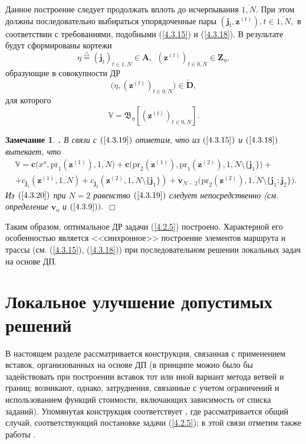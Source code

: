 \documentclass[11pt,twoside,openany]{report}
\newcommand{\bfn}{\begin{equation}}
\newcommand{\efn}{\end{equation}}
\newcommand{\df}{\stackrel{\triangle}{=}}
\newcommand{\ov}{\overline}
\newcounter{theo}
\newcounter{zam}
\newtheorem{zam}{Замечание}[section]
\newcommand{\TL}{\mbox{\bf{$\!\!$.}}}
\newcommand{\sm}{\setminus}
\begin{document}
{$$$$
Данное построение следует продолжать вплоть до исчерпывания $\ov{1,N}.$ При этом должны
последовательно выбираться упорядоченные пары $(\mathbf{j}_t,\mathbf{z}^{(t)}), t\in \ov{1,N},$
в соответствии с требованиями, подобными (\ref{4.3.15}) и (\ref{4.3.18}). В результате будут
сформированы кортежи
$$\eta\df (\mathbf{j}_t)_{t\in\ov{1,N}}\in \mathbf{A},\ \ (\mathbf{z}^{(t)})_{t\in \ov{0,N}}\in \mathbf{Z}_\eta,
$$
образующие в совокупности ДР
$$\bigl(\eta, (\mathbf{z}^{(t)})_{t\in \ov{0,N}}\bigl)\in \widetilde{\mathbf{D}},
$$
для которого
\bfn\label{4.3.19} \mathbb{V}= \mathfrak{B}_\eta[(\mathbf{z}^{(t)})_{t\in \ov{0,N}}].
\efn
\begin{zam}\label{z4.3.1}{\TL}
 В связи с $(\ref{4.3.19})$ отметим, что из $(\ref{4.3.15})$ и $(\ref{4.3.18})$ вытекает, что
\begin{eqnarray}
& \mathbb{V}=\mathbf{c}\bigl(x^o,\mathrm{pr}_1(\mathbf{z}^{(1)}),\ov{1,N}\bigl) +
\mathbf{c}\bigl(\mathrm{pr}_2(\mathbf{z}^{(1)}), \mathrm{pr}_1(\mathbf{z}^{(2)}),\ov{1,N}\sm
\{\mathbf{j}_1\}) +
&\nonumber\\
&+  c_{\mathbf{j}_1}(\mathbf{z}^{(1)},\ov{1,N}) +
c_{\mathbf{j}_2}(\mathbf{z}^{(2)},
\ov{1,N}\sm\{\mathbf{j}_1 \}) +
\mathbf{v}_{N-2}\bigl(\mathrm{pr}_2(\mathbf{z}^{(2)}),\ov{1,N}\sm\{\mathbf{j}_1;\mathbf{j}_2\}\bigl).
&\label{4.3.20}
\end{eqnarray}
 Из $(\ref{4.3.20})$ при $N=2$ равенство $(\ref{4.3.19})$ следует непосредственно (см.
определение $\mathbf{v}_o$ и $(\ref{4.3.9})).$
 \hfill $\Box$
 \end{zam}

Таким образом, оптимальное ДР задачи (\ref{4.2.5}) построено. Характерной его особенностью является
<<синхронное>> построение элементов маршрута и трассы (см. (\ref{4.3.15}), (\ref{4.3.18})) при
последовательном решении локальных задач на основе ДП.


{\raggedright\section{
  Локальное улучшение допустимых решений
}}
\label{sect:4.4}
\setcounter{equation}{0}

В настоящем разделе рассматривается конструкция, связанная с применением вставок,
организованных на основе ДП (в принципе можно было бы задействовать при построении
вставок тот или иной вариант метода ветвей и границ; возникают, однако, затруднения,
связанные с учетом ограничений и использованием функций стоимости, включающих
зависимость от списка заданий). Упомянутая конструкция соответствует  \cite{Cha13`},
где рассматривается общий случай, соответствующий постановке задачи (\ref{4.2.5});
в этой связи отметим также работы   \cite{Cha14`,Cha15`}.

}
\end{document}
